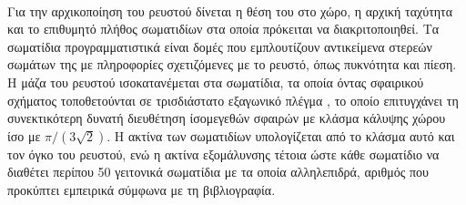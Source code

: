 \paragraph{} Για την αρχικοποίηση του ρευστού δίνεται η θέση του στο χώρο, η αρχική
ταχύτητα και το επιθυμητό πλήθος σωματιδίων στα οποία πρόκειται να διακριτοποιηθεί. Τα
σωματίδια προγραμματιστικά είναι δομές  που εμπλουτίζουν αντικείμενα στερεών
σωμάτων  της  με πληροφορίες σχετιζόμενες με το ρευστό, όπως
πυκνότητα και πίεση. Η μάζα του ρευστού ισοκατανέμεται στα σωματίδια, τα οποία όντας
σφαιρικού σχήματος τοποθετούνται σε τρισδιάστατο εξαγωνικό πλέγμα , το οποίο επιτυγχάνει τη συνεκτικότερη δυνατή διευθέτηση ίσομεγεθών
σφαιρών με κλάσμα κάλυψης χώρου ίσο με $\pi/(3\sqrt{2})$.
Η ακτίνα των σωματιδίων υπολογίζεται από το κλάσμα αυτό και τον όγκο του ρευστού, ενώ η
ακτίνα εξομάλυνσης  τέτοια ώστε κάθε σωματίδιο να διαθέτει περίπου 50 γειτονικά
σωματίδια με τα οποία αλληλεπιδρά, αριθμός που προκύπτει εμπειρικά σύμφωνα με τη
βιβλιογραφία.

